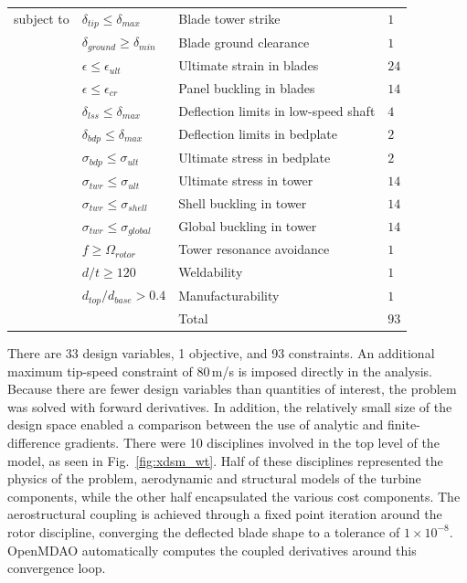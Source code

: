 \documentclass[]{aiaa-tc} %
\begin{document}
\begin{table}[!htb]
\begin{tabular}{r l l l}
            \\
            subject to          & $\delta_{tip} \le \delta_{max}$ & Blade tower strike & $1$ \\
                                    & $\delta_{ground} \ge \delta_{min}$ & Blade ground clearance & $1$ \\
                                    & $\epsilon \le \epsilon_{ult}$ & Ultimate strain in blades & $24$ \\
                                    & $\epsilon \le \epsilon_{cr}$ & Panel buckling in blades & $14$ \\
                                    & $\delta_{lss} \le \delta_{max}$ & Deflection limits in low-speed shaft & $4$ \\
                                    & $\delta_{bdp} \le \delta_{max}$ & Deflection limits in bedplate & $2$ \\
                                    & $\sigma_{bdp} \le \sigma_{ult}$ & Ultimate stress in bedplate & $2$ \\
                                    & $\sigma_{twr} \le \sigma_{ult}$ & Ultimate stress in tower & $14$ \\
                                    & $\sigma_{twr} \le \sigma_{shell}$ & Shell buckling in tower & $14$ \\
                                    & $\sigma_{twr} \le \sigma_{global}$ & Global buckling in tower & $14$ \\
                                    & $f \ge \Omega_{rotor}$ & Tower resonance avoidance & $1$ \\
                                    & $d/t \ge 120$ & Weldability & $1$ \\
                                    & $d_{top}/d_{base} > 0.4$ & Manufacturability & $1$ \\
                                    & & Total & $93$ \\
            \bottomrule
        \end{tabular}
        \label{tab:coe_formulation}
    \end{table}


    There are 33 design variables, 1 objective, and 93 constraints. An additional maximum tip-speed constraint of
    80\,m/s is imposed directly in the analysis.  Because there are
    fewer design variables than quantities of interest, the problem was solved with
    forward derivatives. In addition, the relatively small size of the design space
    enabled a comparison between the use of analytic and finite-difference gradients. There were 10 disciplines
    involved in the top level of the model, as seen in Fig.~\ref{fig:xdsm_wt}.  Half of these disciplines represented the physics of the problem, aerodynamic and structural models of the turbine components, while the other half encapsulated the various cost components.  The aerostructural coupling is achieved through a fixed point iteration around the rotor discipline, converging the deflected blade shape to a tolerance of $1\times10^{-8}$. OpenMDAO automatically computes the coupled derivatives around this convergence loop.
\end{document}
